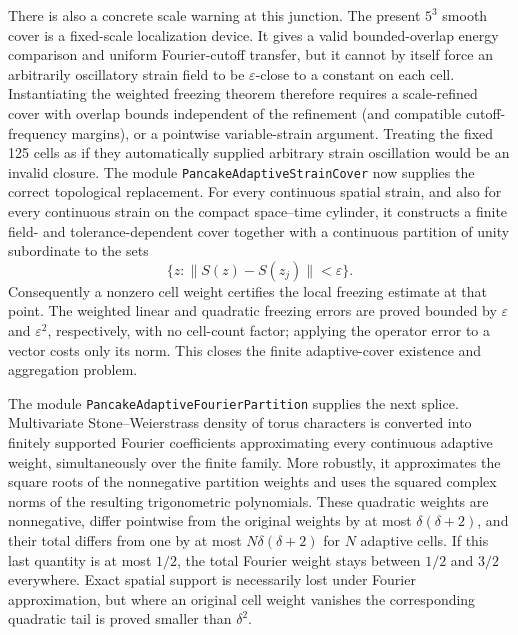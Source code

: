 \documentclass[11pt]{article}
\theoremstyle{definition}
\begin{document}
There is also a concrete scale warning at this junction.  The present
$5^3$ smooth cover is a fixed-scale localization device.  It gives a valid
bounded-overlap energy comparison and uniform Fourier-cutoff transfer, but it
cannot by itself force an arbitrarily oscillatory strain field to be
$\varepsilon$-close to a constant on each cell.  Instantiating the weighted
freezing theorem therefore requires a scale-refined cover with overlap bounds
independent of the refinement (and compatible cutoff-frequency margins), or a
pointwise variable-strain argument.  Treating the fixed 125 cells as if they
automatically supplied arbitrary strain oscillation would be an invalid
closure.
The module \texttt{PancakeAdaptiveStrainCover} now supplies the correct
topological replacement.  For every continuous spatial strain, and also for
every continuous strain on the compact space--time cylinder, it constructs a
finite field- and tolerance-dependent cover together with a continuous
partition of unity subordinate to the sets
\[
 \{z:\|S(z)-S(z_j)\|<\varepsilon\}.
\]
Consequently a nonzero cell weight certifies the local freezing estimate at
that point.  The weighted linear and quadratic freezing errors are proved
bounded by $\varepsilon$ and $\varepsilon^2$, respectively, with no cell-count
factor; applying the operator error to a vector costs only its norm.  This
closes the finite adaptive-cover existence and aggregation problem.

The module \texttt{PancakeAdaptiveFourierPartition} supplies the next splice.
Multivariate Stone--Weierstrass density of torus characters is converted into
finitely supported Fourier coefficients approximating every continuous
adaptive weight, simultaneously over the finite family.  More robustly, it
approximates the square roots of the nonnegative partition weights and uses
the squared complex norms of the resulting trigonometric polynomials.  These
quadratic weights are nonnegative, differ pointwise from the original weights
by at most $\delta(\delta+2)$, and their total differs from one by at most
$N\delta(\delta+2)$ for $N$ adaptive cells.  If this last quantity is at most
$1/2$, the total Fourier weight stays between $1/2$ and $3/2$ everywhere.
Exact spatial support is necessarily lost under Fourier approximation, but
where an original cell weight vanishes the corresponding quadratic tail is
proved smaller than $\delta^2$.
\end{document}
